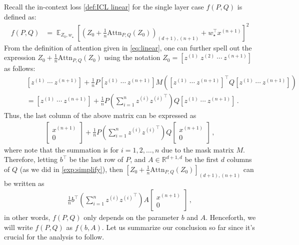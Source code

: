 \documentclass{article}
\DeclareMathOperator{\E}{\mathbb{E}}
\newcommand{\R}{\mathbb{R}}
\newcommand{\att}{\mathrm{Attn}}
\renewcommand{\aa}{M}
\newcommand{\bb}{A}
\newcommand{\cc}{b}
\newcommand{\wstar}{w_\star}
\newcommand{\tz}[1]{{z^{(#1)}}}
\newcommand{\tx}[1]{x^{(#1)}}
\begin{document}
Recall the in-context loss \eqref{def:ICL linear} for the single layer case $f(P,Q)$  is defined as:
\begin{align} 
f\left(P,Q\right)  
&=\E_{Z_0,\wstar} \left[ \left(Z_{0} +\frac{1}{n} \att_{P,Q}(Z_0) \right)_{(d+1),(n+1)} + \wstar^\top \tx{n+1}\right]^2
\end{align} 
From the definition of attention given in \eqref{eq:linear},
one can further spell out the expression $Z_0 +\frac{1}{n} \att_{P,Q}(Z_0)$ using the notation $Z_0 = [\tz{1} \ \tz{2} \ \cdots \ \tz{n+1}]$ as follows:
\begin{align}
&[\tz{1} \ \cdots \ \tz{n+1}] + \frac{1}{n}  P [\tz{1} \  \cdots \ \tz{n+1}]\aa \left([\tz{1} \ \cdots \ \tz{n+1}]^\top Q [\tz{1} \ \cdots \ 
\tz{n+1}] \right)\\
\quad\quad &= [\tz{1} \ \cdots \ \tz{n+1}] + \frac{1}{n}  P  \left(\sum_{i=1}^n \tz{i} {\tz{i}}^\top\right) Q  [\tz{1} \ \cdots \ 
\tz{n+1}]\,.
\end{align}
Thus, the last column of the above matrix can be expressed as
\begin{align} 
\begin{bmatrix}
\tx{n+1}\\ 0
\end{bmatrix}  + \frac{1}{n}  P\left(\sum_{i=1}^n \tz{i} {\tz{i}}^\top \right) Q  
\begin{bmatrix}
\tx{n+1}\\ 0
\end{bmatrix}\,, 
\end{align}
where note that the summation is for $i=1,2,\dots, n$ due to the mask matrix $\aa$.
Therefore, letting $\cc^\top $ be the last row of $P$, and $\bb\in \R^{d+1,d}$ be the first $d$ columns of $Q$ (as we did in \eqref{exp:simplify}), then  $\left[Z_{0} +\frac{1}{n} \att_{P,Q}(Z_0) \right]_{(d+1),(n+1)}$ can be written as
\begin{align} \label{exp:attention_single}
\frac{1}{n}  \cc^\top \left( \sum_{i=1}^n \tz{i} {\tz{i}}^\top \right) \bb 
\begin{bmatrix}
\tx{n+1}\\ 0
\end{bmatrix}\,,
\end{align}
in other words, $f(P,Q)$ only depends on the parameter $\cc$ and $\bb$.
Henceforth, we will write $f(P,Q)$ as  $f(\cc,\bb)$. Let us summarize our conclusion so far since it's crucial for the analysis to follow.
\end{document}
